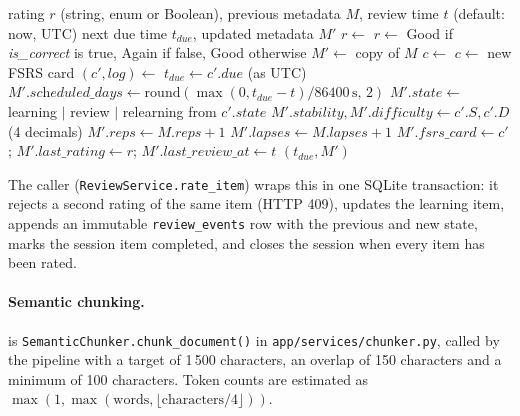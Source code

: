 \begin{algorithm}[htbp]
\caption{FSRS rating update and due-date scheduling}\label{alg:fsrs}
\begin{algorithmic}[1]
\Require rating $r$ (string, enum or Boolean), previous metadata $M$, review time $t$ (default: now, UTC)
\Ensure next due time $t_{due}$, updated metadata $M'$
\State $r \gets$  
  \State $r \gets$ Good if \textit{is\_correct} is true, Again if false, Good otherwise
\EndIf
\State $M' \gets$ copy of $M$
  \State $c \gets$ 
\Else
  \State $c \gets$ new FSRS card 
\EndIf
\State $(c', log) \gets$  
\State $t_{due} \gets c'.\textit{due}$ (as UTC)
\State $M'.\textit{scheduled\_days} \gets \mathrm{round}(\max(0, t_{due}-t)/86400\,\mathrm{s},\,2)$
\State $M'.\textit{state} \gets$ learning $|$ review $|$ relearning from $c'.\textit{state}$
\State $M'.\textit{stability}, M'.\textit{difficulty} \gets c'.S, c'.D$ (4 decimals)
\State $M'.\textit{reps} \gets M.\textit{reps}+1$
  \State $M'.\textit{lapses} \gets M.\textit{lapses}+1$
\EndIf
\State $M'.\textit{fsrs\_card} \gets c'$; $M'.\textit{last\_rating} \gets r$; $M'.\textit{last\_review\_at} \gets t$
\State \Return $(t_{due}, M')$
\end{algorithmic}
\end{algorithm}

The caller (\texttt{ReviewService.rate\_item}) wraps this in one SQLite transaction: it
rejects a second rating of the same item (HTTP 409), updates the learning item, appends
an immutable \texttt{review\_events} row with the previous and new state, marks the
session item completed, and closes the session when every item has been rated.

\paragraph{Semantic chunking.}
 is \texttt{SemanticChunker.chunk\_document()} in
\texttt{app/services/chunker.py}, called by the pipeline with a target of 1\,500
characters, an overlap of 150 characters and a minimum of 100 characters. Token counts
are estimated as $\max(1, \max(\text{words}, \lfloor\text{characters}/4\rfloor))$.

